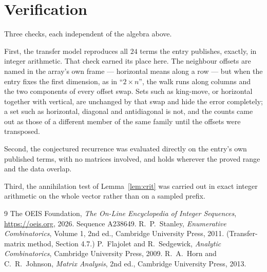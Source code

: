\documentclass[11pt,a4paper]{article}
\theoremstyle{plain}
\theoremstyle{definition}
\begin{document}
\section{Verification}

Three checks, each independent of the algebra above.

First, the transfer model reproduces all $24$ terms the entry publishes, exactly, in
integer arithmetic. That check earned its place here. The neighbour offsets are named in the
array's own frame --- horizontal means along a row --- but when the entry fixes the first
dimension, as in ``$2\times n$'', the walk runs along columns and the two components of every
offset swap. Sets such as king-move, or horizontal together with vertical, are unchanged by
that swap and hide the error completely; a set such as horizontal, diagonal and antidiagonal
is not, and the counts came out as those of a different member of the same family until the
offsets were transposed.

Second, the conjectured recurrence was evaluated directly on the entry's own published terms,
with no matrices involved, and holds wherever the proved range and the data overlap.

Third, the annihilation test of Lemma~\ref{lem:crit} was carried out in exact integer
arithmetic on the whole vector rather than on a sampled prefix.

\begin{thebibliography}{9}
 The OEIS Foundation, \emph{The On-Line Encyclopedia of Integer
Sequences}, \url{https://oeis.org}, 2026. Sequence A238649.
 R.~P.~Stanley, \emph{Enumerative Combinatorics}, Volume 1, 2nd ed.,
Cambridge University Press, 2011. (Transfer-matrix method, Section 4.7.)
 P.~Flajolet and R.~Sedgewick, \emph{Analytic Combinatorics}, Cambridge
University Press, 2009.
 R.~A.~Horn and C.~R.~Johnson, \emph{Matrix Analysis}, 2nd ed., Cambridge
University Press, 2013.
\end{thebibliography}
\end{document}
